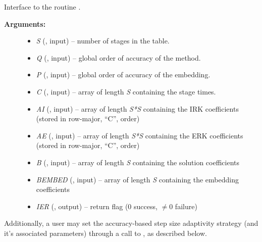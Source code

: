 \documentclass[letterpaper,10pt,english]{sphinxmanual}
\begin{document}
\begin{fulllineitems}
\label{f_interface/Usage:f/_/FARKSETARKTABLES}
Interface to the routine {\hyperref[c_interface/User_callable:c.ARKodeSetARKTables]{\emph{}}}.
\begin{description}
\item[{\textbf{Arguments:}}] \leavevmode\begin{itemize}
\item {} 
\emph{S} (, input) -- number of stages in the table.

\item {} 
\emph{Q} (, input) -- global order of accuracy of the method.

\item {} 
\emph{P} (, input) -- global order of accuracy of the embedding.

\item {} 
\emph{C} (, input) -- array of length \emph{S} containing the stage times.

\item {} 
\emph{AI} (, input) -- array of length \emph{S*S} containing the IRK coefficients
(stored in row-major, ``C'', order)

\item {} 
\emph{AE} (, input) -- array of length \emph{S*S} containing the ERK coefficients
(stored in row-major, ``C'', order)

\item {} 
\emph{B} (, input) -- array of length \emph{S} containing the solution coefficients

\item {} 
\emph{BEMBED} (, input) -- array of length \emph{S} containing the embedding
coefficients

\item {} 
\emph{IER} (, output) -- return flag (0 success, \(\ne 0\) failure)

\end{itemize}

\end{description}

\end{fulllineitems}


Additionally, a user may set the accuracy-based step size adaptivity
strategy (and it's associated parameters) through a call to
{\hyperref[f_interface/Usage:f/_/FARKSETADAPTIVITYMETHOD]{\emph{}}}, as described below.
\end{document}
